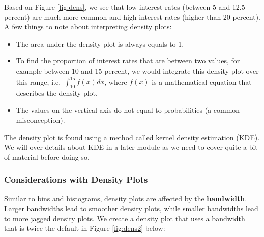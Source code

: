 \documentclass[
]{book}
\newenvironment{Shaded}{\begin{snugshade}}{\end{snugshade}}
\newcommand{\AttributeTok}[1]{\textcolor[rgb]{0.13,0.29,0.53}{#1}}
\newcommand{\DecValTok}[1]{\textcolor[rgb]{0.00,0.00,0.81}{#1}}
\newcommand{\FunctionTok}[1]{\textcolor[rgb]{0.13,0.29,0.53}{\textbf{#1}}}
\newcommand{\NormalTok}[1]{#1}
\newcommand{\SpecialCharTok}[1]{\textcolor[rgb]{0.81,0.36,0.00}{\textbf{#1}}}
\newcommand{\StringTok}[1]{\textcolor[rgb]{0.31,0.60,0.02}{#1}}
\providecommand{\tightlist}{%
  \setlength{\itemsep}{0pt}\setlength{\parskip}{0pt}}
\begin{document}
Based on Figure \ref{fig:dens}, we see that low interest rates (between 5 and 12.5 percent) are much more common and high interest rates (higher than 20 percent). A few things to note about interpreting density plots:

\begin{itemize}
\tightlist
\item
  The area under the density plot is always equals to 1.
\item
  To find the proportion of interest rates that are between two values, for example between 10 and 15 percent, we would integrate this density plot over this range, i.e.~\(\int_{10}^{15} f(x) dx\), where \(f(x)\) is a mathematical equation that describes the density plot.
\item
  The values on the vertical axis do not equal to probabilities (a common misconception).
\end{itemize}

The density plot is found using a method called kernel density estimation (KDE). We will over details about KDE in a later module as we need to cover quite a bit of material before doing so.

\subsubsection{Considerations with Density Plots}\label{considerations-with-density-plots}

Similar to bins and histograms, density plots are affected by the \textbf{bandwidth}. Larger bandwidths lead to smoother density plots, while smaller bandwidths lead to more jagged density plots. We create a density plot that uses a bandwidth that is twice the default in Figure \ref{fig:dens2} below:

\begin{Shaded}
\end{Shaded}
\end{document}
